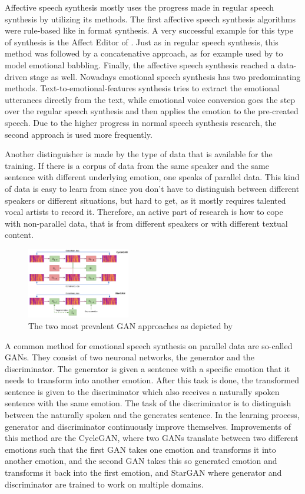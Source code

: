 \documentclass[11pt]{article}
\begin{document}
Affective speech synthesis mostly uses the progress made in regular speech synthesis by utilizing its methods. The first affective speech synthesis algorithms were rule-based like in format synthesis. A very successful example for this type of synthesis is the Affect Editor of \cite{cahn_generation_2000}. Just as in regular speech synthesis, this method was followed by a concatenative approach, as for example used by \cite{pierre-yves_production_2003} to model emotional babbling. Finally, the affective speech synthesis reached a data-driven stage as well.
Nowadays emotional speech synthesis has two predominating methods. Text-to-emotional-features synthesis tries to extract the emotional utterances directly from the text, while emotional voice conversion goes the step over the regular speech synthesis and then applies the emotion to the pre-created speech. Due to the higher progress in normal speech synthesis research, the second approach is used more frequently.

Another distinguisher is made by the type of data that is available for the training. If there is a corpus of data from the same speaker and the same sentence with different underlying emotion, one speaks of parallel data. This kind of data is easy to learn from since you don’t have to distinguish between different speakers or different situations, but hard to get, as it mostly requires talented vocal artists to record it. Therefore, an active part of research is how to cope with non-parallel data, that is from different speakers or with different textual content.

\begin{figure}[h]
 \centering
\includegraphics[width=0.4\textwidth]{"Bilder/GAN.PNG"}
\caption{The two most prevalent GAN approaches as depicted by \cite{triantafyllopoulos_overview_2023}}
\end{figure}

A common method for emotional speech synthesis on parallel data are so-called GANs. They consist of two neuronal networks, the generator and the discriminator. The generator is given a sentence with a specific emotion that it needs to transform into another emotion. After this task is done, the transformed sentence is given to the discriminator which also receives a naturally spoken sentence with the same emotion. The task of the discriminator is to distinguish between the naturally spoken and the generates sentence. In the learning process, generator and discriminator continuously improve themselves. Improvements of this method are the CycleGAN, where two GANs translate between two different emotions such that the first GAN takes one emotion and transforms it into another emotion, and the second GAN takes this so generated emotion and transforms it back into the first emotion, and StarGAN where generator and discriminator are trained to work on multiple domains.
\end{document}
